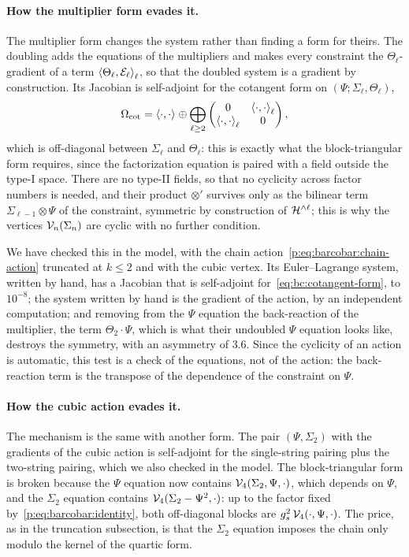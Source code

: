 \paragraph{How the multiplier form evades it.}
The multiplier form changes the system rather than finding a form for theirs.
The doubling adds the equations of the multipliers and makes every constraint the $\Theta_\ell$-gradient of a term $\pair[\ell]{\Theta_\ell}{\mathcal E_\ell}$, so that the doubled system is a gradient by construction.
Its Jacobian is self-adjoint for the cotangent form on $(\Psi; \Sigma_\ell, \Theta_\ell)$,
\begin{equation}
  \label{eq:bc:cotangent-form}
  \Omega_{\mathrm{cot}}
    = \pair{\cdot}{\cdot}
      \oplus \bigoplus_{\ell \ge 2}
      \begin{pmatrix}
        0 & \pair[\ell]{\cdot}{\cdot} \\
        \pair[\ell]{\cdot}{\cdot} & 0
      \end{pmatrix},
\end{equation}
which is off-diagonal between $\Sigma_\ell$ and $\Theta_\ell$: this is exactly what the block-triangular form requires, since the factorization equation is paired with a field outside the type-I space.
There are no type-II fields, so that no cyclicity across factor numbers is needed, and their product $\otimes'$ survives only as the bilinear term $\Sigma_{\ell - 1} \otimes \Psi$ of the constraint, symmetric by construction of $\Hn{\ell}$; this is why the vertices $\vertex{n}(\Sigma_n)$ are cyclic with no further condition.

We have checked this in the model, with the chain action~\eqref{p:eq:barcobar:chain-action} truncated at $k \le 2$ and with the cubic vertex.
Its Euler--Lagrange system, written by hand, has a Jacobian that is self-adjoint for~\eqref{eq:bc:cotangent-form}, to $10^{-8}$; the system written by hand is the gradient of the action, by an independent computation; and removing from the $\Psi$ equation the back-reaction of the multiplier, the term $\Theta_2 \cdot \Psi$, which is what their undoubled $\Psi$ equation looks like, destroys the symmetry, with an asymmetry of $3.6$.
Since the cyclicity of an action is automatic, this test is a check of the equations, not of the action: the back-reaction term is the transpose of the dependence of the constraint on $\Psi$.

\paragraph{How the cubic action evades it.}
The mechanism is the same with another form.
The pair $(\Psi, \Sigma_2)$ with the gradients of the cubic action is self-adjoint for the single-string pairing plus the two-string pairing, which we also checked in the model.
The block-triangular form is broken because the $\Psi$ equation now contains $\vertex{4}(\Sigma_2, \Psi, \cdot)$, which depends on $\Psi$, and the $\Sigma_2$ equation contains $\vertex{4}(\Sigma_2 - \Psi^2, \cdot)$: up to the factor fixed by~\eqref{p:eq:barcobar:identity}, both off-diagonal blocks are $\gs^2 \, \vertex{4}(\cdot, \Psi, \cdot)$.
The price, as in the truncation subsection, is that the $\Sigma_2$ equation imposes the chain only modulo the kernel of the quartic form.

